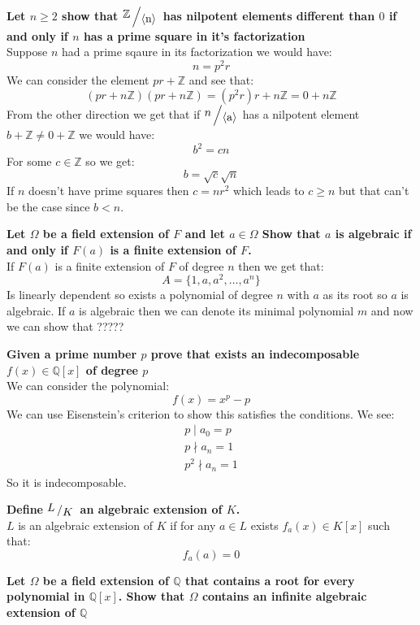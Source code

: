\documentclass{article}
\theoremstyle{plain}
\newcommand{\Z}{\mathbb{Z}}
\newcommand{\Q}{\mathbb{Q}}
\newcommand{\bigslant}[2]
{{\raisebox{.2em}{$#1$}\left/\raisebox{-.2em}{$#2$}\right.}}
\newcommand{\ideal}[1]
{\langle $#1$ \rangle}
\begin{document}
	\newpage
	
	\textbf{Let $n \geq 2$ show that $\bigslant{\Z}{\ideal{n}}$ has nilpotent
	elements different than $0$ if and only if $n$ has a prime square in it's 
	factorization} \\
	Suppose $n$ had a prime sqaure in its factorization we would have:
	\[
		n = p^2 r
	\]
	We can consider the element $pr+\Z$ and see that:
	\[
		(pr+n\Z)(pr+n\Z) = (p^2r)r+n\Z = 0+n\Z
	\]
	From the other direction we get that if $\bigslant{n}{\ideal{a}}$ has
	a nilpotent element $b+\Z \neq 0+\Z$ we would have:
	\[
		b^2 = cn
	\]
	For some $c\in\Z$ so we get:
	\[
		b = \sqrt{c}\sqrt{n}
	\]
	If $n$ doesn't have prime squares then $c=nr^2$ which leads to $c \geq n$
	but that can't be the case since $b < n$.
	
	\newpage
	
	\textbf{Let $\Omega$ be a field extension of $F$ and let $a\in\Omega$
	Show that $a$ is algebraic if and only if $F(a)$ is a finite extension
	of $F$.} \\
	If $F(a)$ is a finite extension of $F$ of degree $n$ then we get that:
	\[
		A = \{1,a,a^2,\dots,a^n\}
	\]
	Is linearly dependent so exists a polynomial of degree $n$ with $a$ as
	its root so $a$ is algebraic. If $a$ is algebraic then we can denote
	its minimal polynomial $m$ and now we can show that ?????
	
	\newpage
	
	\textbf{Given a prime number $p$ prove that exists an indecomposable 
	$f(x)\in\Q[x]$ of degree $p$} \\
	We can consider the polynomial:
	\[
		f(x) = x^p - p
	\]
	We can use Eisenstein's criterion to show this satisfies the conditions.
	We see:
	\begin{align*}
		p \mid a_0 = p \\
		p \nmid a_n = 1 \\
		p^2 \nmid a_n = 1
	\end{align*}
	So it is indecomposable.
	
	\newpage
	
	\textbf{Define $\bigslant{L}{K}$ an algebraic extension of $K$.} \\
	$L$ is an algebraic extension of $K$ if for any $a\in L$ exists 
	$f_a(x)\in K[x]$ such that:
	\[
		f_a(a) = 0
	\]
	
	\newpage
	
	\textbf{Let $\Omega$ be a field extension of $\Q$ that contains a root
	for every polynomial in $\Q[x]$. Show that $\Omega$ contains an infinite
	algebraic extension of $\Q$} \\
	
	
	
	
	
	
	
	
	
\end{document}
